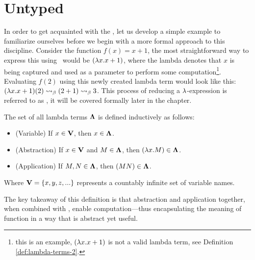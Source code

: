 \section{\centering Untyped \lCalc}
In order to get acquainted with the \lcalc, let us develop a simple example to familiarize ourselves before we begin with a more formal approach to this discipline. Consider the function $f(x) = x + 1$, the most straightforward way to express this using \lcalc \ would be $(\lambda x . x + 1 )$, where the lambda denotes that $x$ is being captured and used as a parameter to perform some computation\footnote{this is an example, $(\lambda x . x + 1 )$ is not a valid lambda term, see Definition \ref{def:lambda-terms-2}.}. Evaluating $f(2)$ using this newly created lambda term would look like this: $(\lambda x . x + 1)(2) \mathrel{\leadsto}_\beta (2 + 1) \mathrel{\leadsto}_\beta 3$. This process of reducing a $\lambda$-expression is referred to as \bred, it will be covered formally later in the chapter.

\begin{definition} The set of all lambda terms \( \mathbf{\Lambda} \) is defined inductively as follows:
  \label{def:lambda-terms-1}
  \begin{itemize}
  \item (Variable) If \( x \in \mathbf{V} \), then \( x \in \mathbf{\Lambda} \).
  \item (Abstraction) If \( x \in \mathbf{V} \) and \( M \in \mathbf{\Lambda} \), then \( (\lambda x. M) \in \mathbf{\Lambda} \).
  \item (Application) If \( M, N \in \mathbf{\Lambda} \), then \((M N) \in \mathbf{\Lambda} \).
  \end{itemize}
  Where $\mathbf{V} = \{x, y, z, ... \}$ represents a countably infinite set of variable names.
\end{definition}
  
The key takeaway of this definition is that abstraction and application together, when combined with \bred, enable computation—thus encapsulating the meaning of function in a way that is abstract yet useful.

